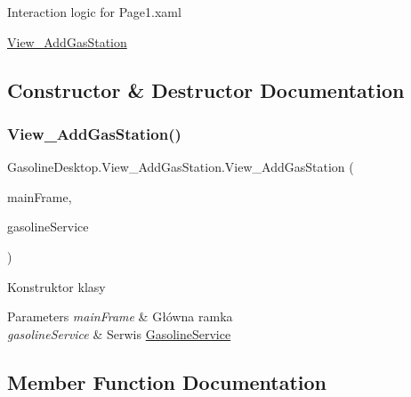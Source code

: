 Interaction logic for Page1.\+xaml

\mbox{\hyperlink{class_gasoline_desktop_1_1_view___add_gas_station}{View\+\_\+\+Add\+Gas\+Station}}

\subsection{Constructor \& Destructor Documentation}
\mbox{\label{class_gasoline_desktop_1_1_view___add_gas_station_af8c05d6d1707bb2671c8a33bac064a1e}} 
\subsubsection{\texorpdfstring{View\_AddGasStation()}{View\_AddGasStation()}}
{\footnotesize\ttfamily Gasoline\+Desktop.\+View\+\_\+\+Add\+Gas\+Station.\+View\+\_\+\+Add\+Gas\+Station (\begin{DoxyParamCaption}\item[{Frame}]{main\+Frame,  }\item[{\mbox{\hyperlink{class_gasoline_desktop_1_1_gasoline_service}{Gasoline\+Service}}}]{gasoline\+Service }\end{DoxyParamCaption})}



Konstruktor klasy 


\begin{DoxyParams}{Parameters}
{\em main\+Frame} & Główna ramka\\
\hline
{\em gasoline\+Service} & Serwis \mbox{\hyperlink{class_gasoline_desktop_1_1_gasoline_service}{Gasoline\+Service}}\\
\hline
\end{DoxyParams}


\subsection{Member Function Documentation}
\mbox{\label{class_gasoline_desktop_1_1_view___add_gas_station_ac4b16228281e3a2095d38884963fd93f}} 
